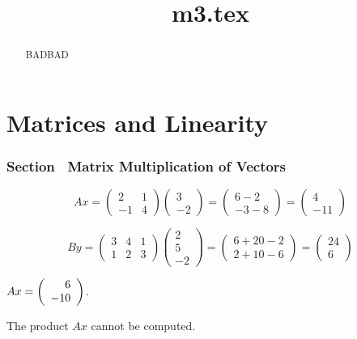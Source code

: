 \documentclass{ximera}
\title{m3.tex}
\begin{document}
\begin{abstract}
BADBAD
\end{abstract}
\maketitle

\chapter{Matrices and Linearity}

\subsection*{Section~\protect{\ref{S:4.1}} Matrix Multiplication of Vectors}

\[
Ax =
\left(\begin{array}{rr} 2 & 1 \\ -1 & 4\end{array}\right)
\left(\begin{array}{r} 3 \\ -2\end{array}\right) =
\left(\begin{array}{r} 6 - 2 \\ -3 - 8\end{array}\right) =
\left(\begin{array}{r} 4 \\ -11\end{array}\right)
\]

\[
By =
\left(\begin{array}{rrr} 3 & 4 & 1 \\ 1 & 2 & 3\end{array}\right)
\left(\begin{array}{r} 2 \\ 5 \\ -2\end{array}\right) = 
\left(\begin{array}{r} 6 + 20 - 2 \\ 2 + 10 - 6\end{array}\right) =
\left(\begin{array}{r} 24 \\ 6\end{array}\right)
\]

 $Ax = \left(\begin{array}{r} 6 \\ -10\end{array}\right)$.

 The product $Ax$ cannot be computed.
\end{document}
